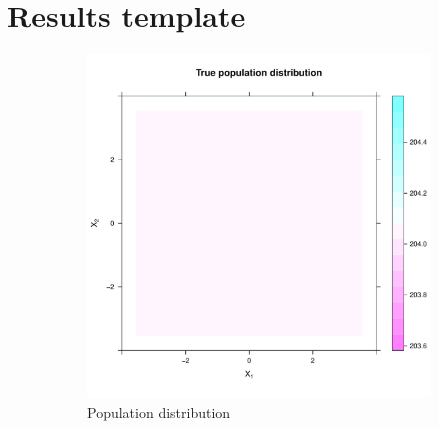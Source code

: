 \section*{Results template}
\label{sec:results:template}
\graphicspath{{./results/unif_100_1.0_1h/}}
\makeatletter
{}
\makeatother

\begin{figure}[htbp]
    \centering
    \begin{subfigure}[t]{0.32\textwidth}
    \includegraphics[width=\textwidth]{output/population-heatmap}
    \caption{Population distribution}
    \end{subfigure}
    \begin{subfigure}[t]{0.32\textwidth}

\end{subfigure}
\end{figure}
